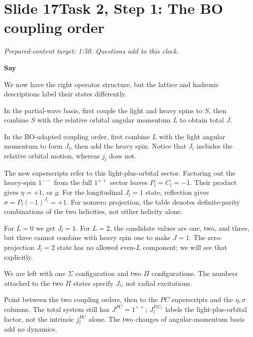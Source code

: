 \documentclass[11pt,a4paper]{article}
\newcommand{\cue}[1]{\begin{private}#1\end{private}}
\newenvironment{speech}{\par\textbf{Say}\par}{\par}
\newcommand{\slidenote}[3]{%
  \clearpage
  \pdfbookmark[1]{Slide #1}{slide-#1}%
  \section*{Slide #1\quad #2}
  \textit{Prepared-content target: #3. Questions add to this clock.}\par
}
\begin{document}
\slidenote{17}{Task 2, Step 1: The BO coupling order}{1:50}
\begin{speech}
We now have the right operator structure, but the lattice and hadronic
descriptions label their states differently.

In the partial-wave basis, first couple the light and heavy spins to
$S$, then combine $S$ with the relative orbital angular momentum $L$
to obtain total $J$.

In the BO-adapted coupling order, first combine $L$ with the light
angular momentum to form $J_l$, then add the heavy spin. Notice that
$J_l$ includes the relative orbital motion, whereas $j_l$ does not.

The new superscripts refer to this light-plus-orbital sector. Factoring
out the heavy-spin $1^{--}$ from the full $1^{++}$ sector leaves
$P_l=C_l=-1$. Their product gives $\eta=+1$, or $g$. For the
longitudinal $J_l=1$ state, reflection gives
$\sigma=P_l(-1)^{J_l}=+1$. For nonzero projection, the table denotes
definite-parity combinations of the two helicities, not either helicity alone.

For $L=0$ we get $J_l=1$. For $L=2$, the candidate values are one,
two, and three, but three cannot combine with heavy spin one to make
$J=1$. The zero-projection $J_l=2$ state has no allowed even-$L$
component; we will see that explicitly.

We are left with one $\Sigma$ configuration and two $\Pi$
configurations. The numbers attached to the two $\Pi$ states specify
$J_l$, not radial excitations.
\end{speech}
\cue{Point between the two coupling orders, then to the $PC$ superscripts
and the $\eta,\sigma$ columns. The total system still has $J^{PC}=1^{++}$;
$J_l^{P_lC_l}$ labels the light-plus-orbital factor, not the intrinsic
$j_l^{PC}$ alone. The two changes of angular-momentum basis add no dynamics.}
\end{document}

